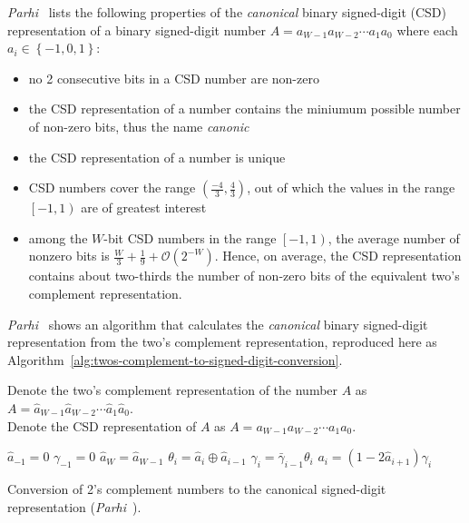 \documentclass[a4paper,twoside,10pt,english]{report}
\begin{document}
\emph{Parhi}~\cite[Section 13.6]{Parhi_VLSIDigitalSignalProcessingSystems} lists
the following properties of the \emph{canonical} binary signed-digit (CSD)
representation of a binary signed-digit number $A=a_{W-1}a_{W-2}\cdots{}a_{1}a_{0}$
where each $a_{i}\in \left\{-1,0,1\right\}$:
\begin{itemize}
\item no 2 consecutive bits in a CSD number are non-zero
\item the CSD representation of a number contains the miniumum possible number
of non-zero bits, thus the name \emph{canonic}
\item the CSD representation of a number is unique
\item CSD numbers cover the range $\left(\frac{-4}{3},\frac{4}{3}\right)$, out
of which the values in the range $\left[-1,1\right)$ are of greatest interest
\item among the $W$-bit CSD numbers in the range $\left[-1,1\right)$, the
average number of nonzero bits is 
$\frac{W}{3}+\frac{1}{9}+\mathcal{O}\left(2^{-W}\right)$. Hence, on average, the
CSD representation contains about two-thirds the number of
non-zero bits of the equivalent two's complement representation.
\end{itemize}

\emph{Parhi}~\cite[Section 13.6.1]{Parhi_VLSIDigitalSignalProcessingSystems}
shows an algorithm that calculates the \emph{canonical} binary signed-digit 
representation from the two's complement representation, reproduced here as
Algorithm~\ref{alg:twos-complement-to-signed-digit-conversion}.

\begin{algorithm}[!htbp]
Denote the two's complement representation of the number $A$ as 
$A=\hat{a}_{W-1}\hat{a}_{W-2}\cdots\hat{a}_{1}\hat{a}_{0}$. \\
Denote the CSD representation of $A$ as $A=a_{W-1}a_{W-2}\cdots{}a_{1}a_{0}$.

\begin{algorithmic}
\State $\hat{a}_{-1}=0$
\State $\gamma_{-1}=0$
\State $\hat{a}_{W}=\hat{a}_{W-1}$
\State $\theta_{i}=\hat{a}_{i}\oplus\hat{a}_{i-1}$
\State $\gamma_{i}=\bar{\gamma}_{i-1}\theta_{i}$
\State $a_{i}=\left(1-2\hat{a}_{i+1}\right)\gamma_{i}$
\EndFor
\end{algorithmic}
\caption{Conversion of 2's complement numbers to the canonical signed-digit
representation 
(\emph{Parhi}~\cite[Section 13.6.1]{Parhi_VLSIDigitalSignalProcessingSystems}).}
\label{alg:twos-complement-to-signed-digit-conversion}
\end{algorithm}
\end{document}
